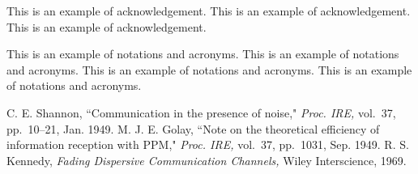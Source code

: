 \documentclass[11pt]{now}
\begin{document}
\begin{acknowledgements}
This is an example of acknowledgement. This is an example of
acknowledgement. This is an example of acknowledgement.
\end{acknowledgements}
\begin{notationsandacronyms}
This is an example of notations and acronyms. This is an example of
notations and acronyms. This is an example of notations and acronyms. This is an example of
notations and acronyms.
\end{notationsandacronyms}
\begin{thebibliography}{99}
C. E. Shannon, ``Communication in the presence of noise," {\em Proc.
IRE,} vol.~37, pp.~10--21, Jan. 1949.
M. J. E. Golay, ``Note on the theoretical efficiency of information
reception with PPM," {\em Proc. IRE,} vol.~37, pp.~1031, Sep. 1949.
R. S. Kennedy, {\em Fading Dispersive Communication Channels,} Wiley
Interscience, 1969.


\end{thebibliography}
\end{document}
